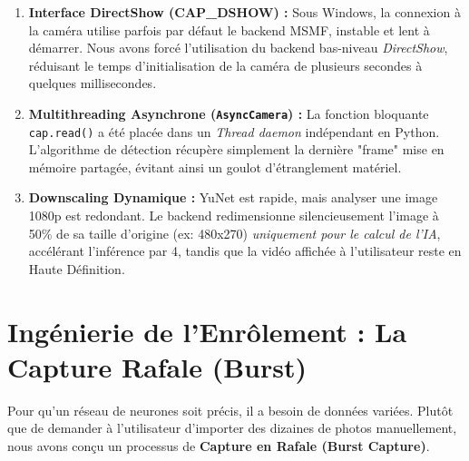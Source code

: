 \documentclass[12pt,a4paper]{report}
\begin{document}
\begin{enumerate}
    \item \textbf{Interface DirectShow (CAP\_DSHOW) :} Sous Windows, la connexion à la caméra utilise parfois par défaut le backend MSMF, instable et lent à démarrer. Nous avons forcé l'utilisation du backend bas-niveau \textit{DirectShow}, réduisant le temps d'initialisation de la caméra de plusieurs secondes à quelques millisecondes.
    \item \textbf{Multithreading Asynchrone (\texttt{AsyncCamera}) :} La fonction bloquante \texttt{cap.read()} a été placée dans un \textit{Thread daemon} indépendant en Python. L'algorithme de détection récupère simplement la dernière "frame" mise en mémoire partagée, évitant ainsi un goulot d'étranglement matériel.
    \item \textbf{Downscaling Dynamique :} YuNet est rapide, mais analyser une image 1080p est redondant. Le backend redimensionne silencieusement l'image à 50\% de sa taille d'origine (ex: 480x270) \textit{uniquement pour le calcul de l'IA}, accélérant l'inférence par 4, tandis que la vidéo affichée à l'utilisateur reste en Haute Définition.
\end{enumerate}

\section{Ingénierie de l'Enrôlement : La Capture Rafale (Burst)}
Pour qu'un réseau de neurones soit précis, il a besoin de données variées. Plutôt que de demander à l'utilisateur d'importer des dizaines de photos manuellement, nous avons conçu un processus de \textbf{Capture en Rafale (Burst Capture)}.
\end{document}
